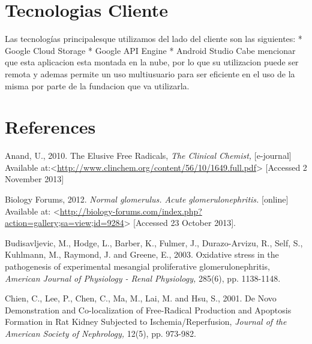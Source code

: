 \documentclass[12pt]{report}
\begin{document}
\section*{Tecnologias Cliente}
\begin{flushleft}
Las tecnologías principalesque utilizamos del lado del cliente son las siguientes:
\newline
\newline
* Google Cloud Storage
\newline
* Google API Engine
\newline
* Android Studio
\newline
Cabe mencionar que esta aplicacion esta montada en la nube, por lo que su utilizacion puede ser remota y ademas permite un uso multiusuario para ser eficiente en el uso de la misma por parte de la fundacion que va utilizarla.
\end{flushleft}

\newpage
\section*{References}

Anand, U., 2010. The Elusive Free Radicals, \textit{The Clinical Chemist,} [e-journal] Available at:<\url{http://www.clinchem.org/content/56/10/1649.full.pdf}> [Accessed 2 November 2013]
\newline
\newline

Biology Forums, 2012. \textit{Normal glomerulus. Acute glomerulonephritis.} [online] Available at: <\url{http://biology-forums.com/index.php?action=gallery;sa=view;id=9284}> [Accessed 23 October 2013].
\newline
\newline

Budisavljevic, M., Hodge, L., Barber, K., Fulmer, J., Durazo-Arvizu, R., Self, S., Kuhlmann, M., Raymond, J. and Greene, E., 2003. Oxidative stress in the pathogenesis of experimental mesangial proliferative glomerulonephritis, \textit{American Journal of Physiology - Renal Physiology,} 285(6), pp. 1138-1148.
\newline
\newline

Chien, C., Lee, P., Chen, C., Ma, M., Lai, M. and Hsu, S., 2001. De Novo Demonstration and Co-localization of Free-Radical Production and Apoptosis Formation in Rat Kidney Subjected to Ischemia/Reperfusion, \textit{Journal of the American Society of Nephrology,} 12(5), pp. 973-982.
\newline
\newline
\end{document}
